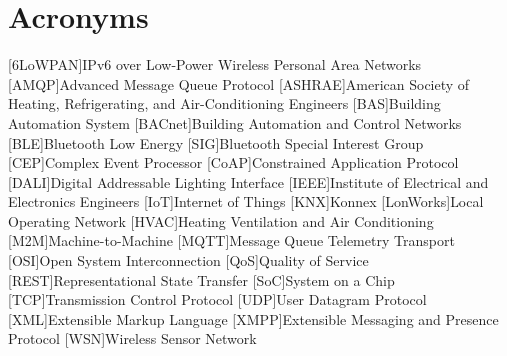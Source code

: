 \chapter{Acronyms}

\footnotesize
\SingleSpacing

\begin{multicols}{2}
\begin{acronym}[AAAAAA]
	[6LoWPAN]{IPv6 over Low-Power Wireless Personal Area Networks}
	[AMQP]{Advanced Message Queue Protocol}
	[ASHRAE]{American Society of Heating, Refrigerating, and Air-Conditioning Engineers}
	[BAS]{Building Automation System}
	[BACnet]{Building Automation and Control Networks}
	[BLE]{Bluetooth Low Energy}
	[SIG]{Bluetooth Special Interest Group}
	[CEP]{Complex Event Processor}
	[CoAP]{Constrained Application Protocol}
	[DALI]{Digital Addressable Lighting Interface}
	[IEEE]{Institute of Electrical and Electronics Engineers}
	[IoT]{Internet of Things}
	[KNX]{Konnex}
	[LonWorks]{Local Operating Network}
	[HVAC]{Heating Ventilation and Air Conditioning}
	[M2M]{Machine-to-Machine}
	[MQTT]{Message Queue Telemetry Transport}
	[OSI]{Open System Interconnection}
	[QoS]{Quality of Service}
	[REST]{Representational State Transfer}
	[SoC]{System on a Chip}
	[TCP]{Transmission Control Protocol}
	[UDP]{User Datagram Protocol}
	[XML]{Extensible Markup Language}
	[XMPP]{Extensible Messaging and Presence Protocol}
	[WSN]{Wireless Sensor Network}
	


\end{acronym}
\end{multicols}

